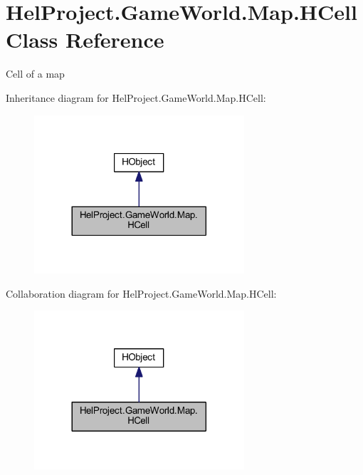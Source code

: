 \hypertarget{class_hel_project_1_1_game_world_1_1_map_1_1_h_cell}{}\section{Hel\+Project.\+Game\+World.\+Map.\+H\+Cell Class Reference}
\label{class_hel_project_1_1_game_world_1_1_map_1_1_h_cell}


Cell of a map  




Inheritance diagram for Hel\+Project.\+Game\+World.\+Map.\+H\+Cell\+:\nopagebreak
\begin{figure}[H]
\begin{center}
\leavevmode
\includegraphics[width=221pt]{class_hel_project_1_1_game_world_1_1_map_1_1_h_cell__inherit__graph}
\end{center}
\end{figure}


Collaboration diagram for Hel\+Project.\+Game\+World.\+Map.\+H\+Cell\+:\nopagebreak
\begin{figure}[H]
\begin{center}
\leavevmode
\includegraphics[width=221pt]{class_hel_project_1_1_game_world_1_1_map_1_1_h_cell__coll__graph}
\end{center}
\end{figure}
